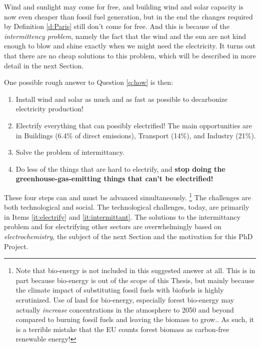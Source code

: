 Wind and sunlight may come for free, and building wind and solar capacity is now even cheaper than fossil fuel generation, but in the end the changes required by Definition \ref{d:Paris} still don't come for free. And this is because of the \textit{intermittency problem}, namely the fact that the wind and the sun are not kind enough to blow and shine exactly when we might need the electricity. It turns out that there are no cheap solutions to this problem, which will be described in more detail in the next Section. 

One possible rough answer to Question \ref{q:how} is then:

\begin{enumerate}
	\item Install wind and solar as much and as fast as possible to decarbonize electricity production!
	
	\item Electrify everything that can possibly electrified! The main opportunities are in Buildings (6.4\% of direct  emissions), Transport (14\%), and Industry (21\%). \label{it:electrify}

	\item Solve the problem of intermittancy. \label{it:intermittant}
	
	\item Do less of the things that are hard to electrify, and \textbf{stop doing the greenhouse-gas-emitting things that can't be electrified!} \label{it:sacrifice}
\end{enumerate}

These four steps can and must be advanced simultaneously.
\footnote{Note that bio-energy is not included in this suggested answer at all. This is in part because bio-energy is out of the scope of this Thesis, but mainly because the climate impact of substituting fossil fuels with biofuels is highly scrutinized. Use of land for bio-energy, especially forest bio-energy may actually \textit{increase}  concentrations in the atmosphere to 2050 and beyond compared to burning fossil fuels and leaving the biomass to grow.\cite{Searchinger2018, Bentsen2017}. As such, it is a terrible mistake that the EU counts forest biomass as carbon-free renewable energy!}
The challenges are both technological and social. The technological challenges, today, are primarily in Items \ref{it:electrify} and \ref{it:intermittant}. The solutions to the intermittancy problem and for electrifying other sectors are overwhelmingly based on \textit{electrochemistry}, the subject of the next Section and the motivation for this PhD Project.

